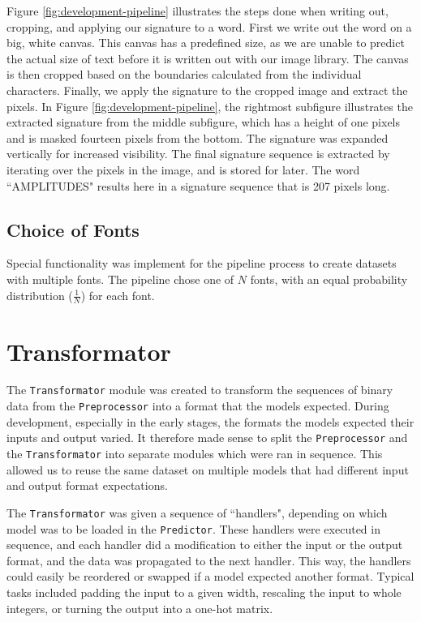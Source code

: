 Figure \ref{fig:development-pipeline} illustrates the steps done when writing out, cropping, and applying our signature to a word. First we write out the word on a big, white canvas. This canvas has a predefined size, as we are unable to predict the actual size of text before it is written out with our image library. The canvas is then cropped based on the boundaries calculated from the individual characters. Finally, we apply the signature to the cropped image and extract the pixels. In Figure \ref{fig:development-pipeline}, the rightmost subfigure illustrates the extracted signature from the middle subfigure, which has a height of one pixels and is masked fourteen pixels from the bottom. The signature was expanded vertically for increased visibility. The final signature sequence is extracted by iterating over the pixels in the image, and is stored for later. The word ``AMPLITUDES" results here in a signature sequence that is 207 pixels long.

\subsection{Choice of Fonts}
Special functionality was implement for the pipeline process to create datasets with multiple fonts. The pipeline chose one of \(N\) fonts, with an equal probability distribution (\(\frac{1}{N}\)) for each font.


\section{Transformator}
\label{sec:transformator}
The {\tt Transformator} module was created to transform the sequences of binary data from the {\tt Preprocessor} into a format that the models expected. During development, especially in the early stages, the formats the models expected their inputs and output varied. It therefore made sense to split the {\tt Preprocessor} and the {\tt Transformator} into separate modules which were ran in sequence. This allowed us to reuse the same dataset on multiple models that had different input and output format expectations.

The {\tt Transformator} was given a sequence of ``handlers", depending on which model was to be loaded in the {\tt Predictor}. These handlers were executed in sequence, and each handler did a modification to either the input or the output format, and the data was propagated to the next handler. This way, the handlers could easily be reordered or swapped if a model expected another format. Typical tasks included padding the input to a given width, rescaling the input to whole integers, or turning the output into a one-hot matrix.


